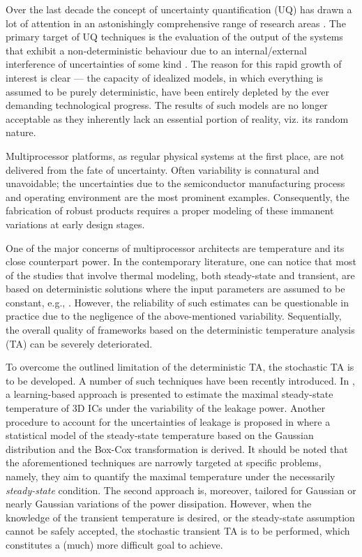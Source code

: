 Over the last decade the concept of uncertainty quantification (UQ) has drawn a lot of attention in an astonishingly comprehensive range of research areas \cite{xiu2009}. The primary target of UQ techniques is the evaluation of the output of the systems that exhibit a non-deterministic behaviour due to an internal/external interference of uncertainties of some kind \cite{eldred2009}. The reason for this rapid growth of interest is clear --- the capacity of idealized models, in which everything is assumed to be purely deterministic, have been entirely depleted by the ever demanding technological progress. The results of such models are no longer acceptable as they inherently lack an essential portion of reality, viz. its random nature.

Multiprocessor platforms, as regular physical systems at the first place, are not delivered from the fate of uncertainty. Often variability is connatural and unavoidable; the uncertainties due to the semiconductor manufacturing process and operating environment are the most prominent examples. Consequently, the fabrication of robust products requires a proper modeling of these immanent variations at early design stages.

One of the major concerns of multiprocessor architects are temperature and its close counterpart power. In the contemporary literature, one can notice that most of the studies that involve thermal modeling, both steady-state and transient, are based on deterministic solutions where the input parameters are assumed to be constant, e.g., \cite{ukhov2012}. However, the reliability of such estimates can be questionable in practice due to the negligence of the above-mentioned variability. Sequentially, the overall quality of frameworks based on the deterministic temperature analysis (TA) can be severely deteriorated.

To overcome the outlined limitation of the deterministic TA, the stochastic TA is to be developed. A number of such techniques have been recently introduced. In \cite{juan2011}, a learning-based approach is presented to estimate the maximal steady-state temperature of 3D ICs under the variability of the leakage power. Another procedure to account for the uncertainties of leakage is proposed in \cite{juan2012} where a statistical model of the steady-state temperature based on the Gaussian distribution and the Box-Cox transformation \cite{box1964} is derived. It should be noted that the aforementioned techniques are narrowly targeted at specific problems, namely, they aim to quantify the maximal temperature under the necessarily \emph{steady-state} condition. The second approach is, moreover, tailored for Gaussian or nearly Gaussian variations of the power dissipation. However, when the knowledge of the transient temperature is desired, or the steady-state assumption cannot be safely accepted, the stochastic transient TA is to be performed, which constitutes a (much) more difficult goal to achieve.

